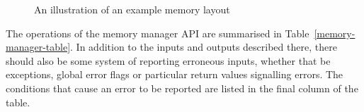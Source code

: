 \documentclass[a4paper,10pt]{report}
\begin{document}
\begin{figure}[ht]
  \centering
  \caption{An illustration of an example memory layout}
  \label{memory-fig}
\end{figure}

The operations of the memory manager API are summarised in
Table~\ref{memory-manager-table}. In addition to the inputs and outputs
described there, there should also be some system of reporting erroneous inputs,
whether that be exceptions, global error flags or particular return values
signalling errors. The conditions that cause an error to be reported are listed
in the final column of the table.
\end{document}

